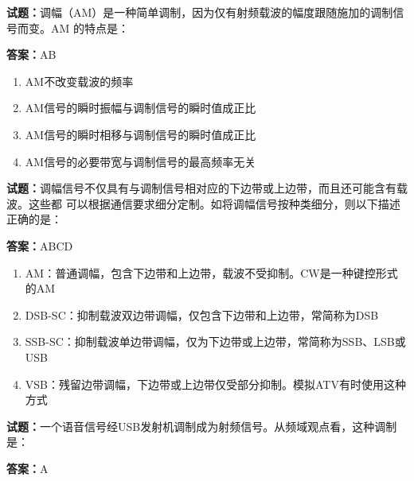 \documentclass{ctexbook}
\begin{document}
\textbf{试题：}调幅（AM）是一种简单调制，因为仅有射频载波的幅度跟随施加的调制信号而变。AM
的特点是： 

\textbf{答案：}AB 

\begin{enumerate}[leftmargin=3em]
  \item AM不改变载波的频率 

  \item AM信号的瞬时振幅与调制信号的瞬时值成正比 

  \item AM信号的瞬时相移与调制信号的瞬时值成正比 

  \item AM信号的必要带宽与调制信号的最高频率无关 


\end{enumerate}





\vspace{1em}

\textbf{试题：}调幅信号不仅具有与调制信号相对应的下边带或上边带，而且还可能含有载波。这些都
可以根据通信要求细分定制。如将调幅信号按种类细分，则以下描述正确的是： 

\textbf{答案：}ABCD 

\begin{enumerate}[leftmargin=3em]
  \item AM：普通调幅，包含下边带和上边带，载波不受抑制。CW是一种键控形式的AM 

  \item DSB-SC：抑制载波双边带调幅，仅包含下边带和上边带，常简称为DSB 

  \item SSB-SC：抑制载波单边带调幅，仅为下边带或上边带，常简称为SSB、LSB或USB 

  \item VSB：残留边带调幅，下边带或上边带仅受部分抑制。模拟ATV有时使用这种方式 

\end{enumerate}





\vspace{1em}

\textbf{试题：}一个语音信号经USB发射机调制成为射频信号。从频域观点看，这种调制是： 

\textbf{答案：}A 
\end{document}

